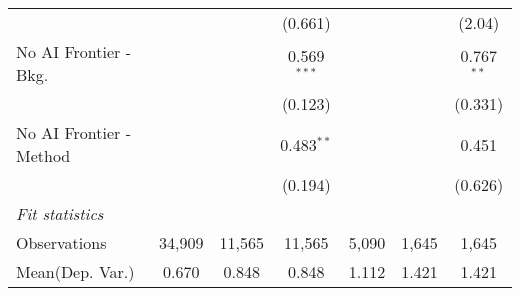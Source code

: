 \begin{tabular}{lcccccc}
                           &               &               & (0.661)       &             &         & (2.04)\\   
   No AI Frontier - Bkg.   &               &               & 0.569$^{***}$ &             &         & 0.767$^{**}$\\   
                           &               &               & (0.123)       &             &         & (0.331)\\   
   No AI Frontier - Method &               &               & 0.483$^{**}$  &             &         & 0.451\\   
                           &               &               & (0.194)       &             &         & (0.626)\\   
   \midrule
   \emph{Fit statistics}\\
   Observations            & 34,909        & 11,565        & 11,565        & 5,090       & 1,645   & 1,645\\  
Mean(Dep. Var.) & 0.670 & 0.848 & 0.848 & 1.112 & 1.421 & 1.421 \\
   

\end{tabular}
